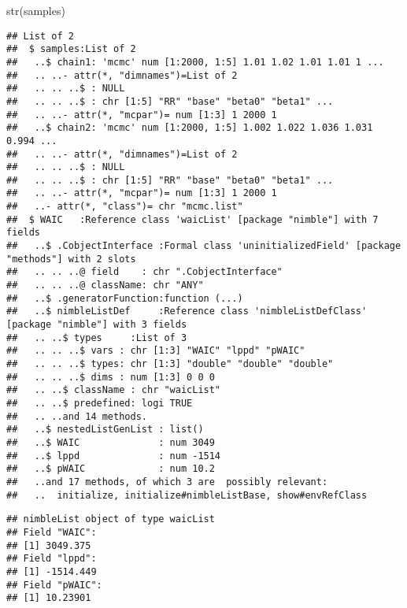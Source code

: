 \documentclass[
]{book}
\newenvironment{Shaded}{\begin{snugshade}}{\end{snugshade}}
\newcommand{\FunctionTok}[1]{\textcolor[rgb]{0.00,0.00,0.00}{#1}}
\newcommand{\NormalTok}[1]{#1}
\newcommand{\SpecialCharTok}[1]{\textcolor[rgb]{0.00,0.00,0.00}{#1}}
\begin{document}
\begin{Shaded}
\begin{Highlighting}[]
\FunctionTok{str}\NormalTok{(samples)}
\end{Highlighting}
\end{Shaded}

\begin{verbatim}
## List of 2
##  $ samples:List of 2
##   ..$ chain1: 'mcmc' num [1:2000, 1:5] 1.01 1.02 1.01 1.01 1 ...
##   .. ..- attr(*, "dimnames")=List of 2
##   .. .. ..$ : NULL
##   .. .. ..$ : chr [1:5] "RR" "base" "beta0" "beta1" ...
##   .. ..- attr(*, "mcpar")= num [1:3] 1 2000 1
##   ..$ chain2: 'mcmc' num [1:2000, 1:5] 1.002 1.022 1.036 1.031 0.994 ...
##   .. ..- attr(*, "dimnames")=List of 2
##   .. .. ..$ : NULL
##   .. .. ..$ : chr [1:5] "RR" "base" "beta0" "beta1" ...
##   .. ..- attr(*, "mcpar")= num [1:3] 1 2000 1
##   ..- attr(*, "class")= chr "mcmc.list"
##  $ WAIC   :Reference class 'waicList' [package "nimble"] with 7 fields
##   ..$ .CobjectInterface :Formal class 'uninitializedField' [package "methods"] with 2 slots
##   .. .. ..@ field    : chr ".CobjectInterface"
##   .. .. ..@ className: chr "ANY"
##   ..$ .generatorFunction:function (...)  
##   ..$ nimbleListDef     :Reference class 'nimbleListDefClass' [package "nimble"] with 3 fields
##   .. ..$ types     :List of 3
##   .. .. ..$ vars : chr [1:3] "WAIC" "lppd" "pWAIC"
##   .. .. ..$ types: chr [1:3] "double" "double" "double"
##   .. .. ..$ dims : num [1:3] 0 0 0
##   .. ..$ className : chr "waicList"
##   .. ..$ predefined: logi TRUE
##   .. ..and 14 methods.
##   ..$ nestedListGenList : list()
##   ..$ WAIC              : num 3049
##   ..$ lppd              : num -1514
##   ..$ pWAIC             : num 10.2
##   ..and 17 methods, of which 3 are  possibly relevant:
##   ..  initialize, initialize#nimbleListBase, show#envRefClass
\end{verbatim}

\begin{Shaded}
\end{Shaded}

\begin{verbatim}
## nimbleList object of type waicList
## Field "WAIC":
## [1] 3049.375
## Field "lppd":
## [1] -1514.449
## Field "pWAIC":
## [1] 10.23901
\end{verbatim}
\end{document}
